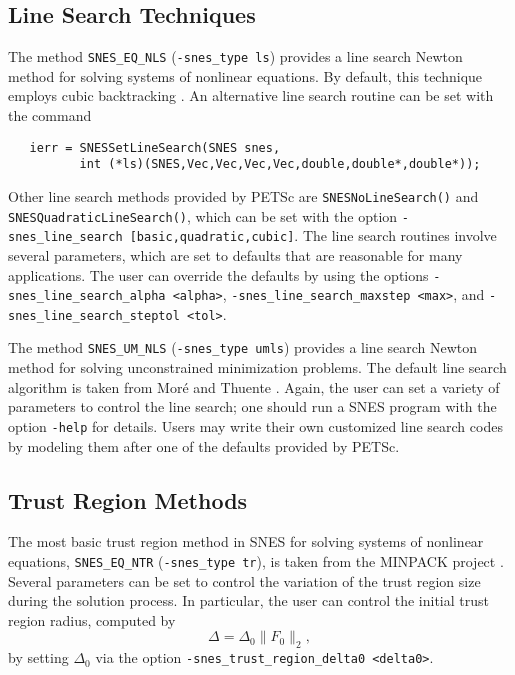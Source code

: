 \subsection{Line Search Techniques} 

The method {\tt SNES\_EQ\_NLS} ({\tt -snes\_type ls}) provides a line
search Newton method for solving systems of nonlinear equations.  By
default, this technique employs cubic backtracking \cite{dennis:83}.
An alternative line search routine can be set with the command
\begin{verbatim}
   ierr = SNESSetLineSearch(SNES snes,
          int (*ls)(SNES,Vec,Vec,Vec,Vec,double,double*,double*));
\end{verbatim}
Other line search methods provided by PETSc are 
{\tt SNESNoLineSearch()} 
and {\tt SNESQuadraticLineSearch()}, 
which can be set with the option
{\tt -snes\_line\_search [basic,quadratic,cubic]}. 
The line search routines involve several parameters, which are set
to defaults that are reasonable for many applications.  The user
can override the defaults by using the options
{\tt -snes\_line\_search\_alpha <alpha>}, 
{\tt -snes\_line\_search\_maxstep <max>}, and 
{\tt -snes\_line\_search\_steptol <tol>}. 

The method {\tt SNES\_UM\_NLS} ({\tt -snes\_type umls}) provides a line
search Newton method for solving unconstrained minimization problems.
The default line search algorithm is taken from Mor\'{e} and Thuente
\cite{more:92}.  Again, the user can set a variety of parameters to
control the line search; one should run a SNES program with the option {\tt -help}
for details.  Users may write their own customized line search codes
by modeling them after one of the defaults provided by PETSc.

\subsection{Trust Region Methods}

The most basic trust region method in SNES for solving systems of nonlinear
equations, {\tt SNES\_EQ\_NTR} ({\tt-snes\_type tr}), is taken from
the MINPACK project \cite{more84}. Several parameters can be set to
control the variation of the trust region size during the solution
process.  In particular, the user can control the initial trust region
radius, computed by
\[
  \Delta = \Delta_0 \| F_0 \|_2,
\]
by setting $ \Delta_0 $ via the option 
{\tt -snes\_trust\_region\_delta0 <delta0>}.

